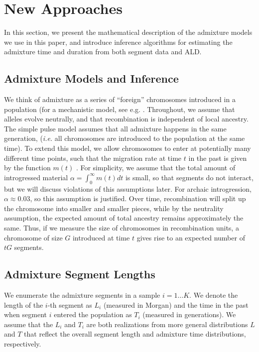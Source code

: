 \documentclass[11pt]{article}
\begin{document}
\section{New Approaches}\label{new approaches}

In this section, we present the mathematical description of the admixture models we use in this paper, and introduce inference algorithms for estimating the admixture time and duration from both segment data and ALD. 


\subsection{Admixture Models and Inference}\label{admixture models}
	
We think of admixture as a series of ``foreign'' chromosomes introduced in a population (for a mechanistic model, see e.g. \cite{pool_inference_2009}. Throughout, we assume that alleles evolve neutrally, and that recombination is independent of local ancestry. The simple pulse model assumes that all admixture happens in the same generation, (\textit{i.e.} all chromosomes are introduced to the population at the same time). To extend this model, we allow chromosomes to enter at potentially many different time points, such that the migration rate at time $t$ in the past is given by the function $m(t)$ \citep{pool_inference_2009, ni_length_2016}. For simplicity, we assume that the total amount of introgressed material $\alpha=\int_0^\infty m(t)dt$ is small, so that segments do not interact, but we will discuss violations of this assumptions later. For archaic introgression, $\alpha \approx 0.03$, so this assumption is justified. Over time, recombination will split up the chromosome into smaller and smaller pieces, while by the neutrality assumption, the expected amount of total ancestry remains approximately the same. Thus, if we measure the size of chromosomes in recombination units, a chromosome of size $G$ introduced at time $t$ gives rise to an expected number of $tG$ segments.


\subsection{Admixture Segment Lengths}
We enumerate the admixture segments in a sample $i=1\dots K$. We denote the length of the $i$-th segment as $L_i$ (measured in Morgan) and the time in the past when segment $i$ entered the population as $T_i$ (measured in generations). We assume that the $L_i$ and $T_i$ are both realizations from more general distributions $L$ and $T$ that reflect the overall segment length and admixture time distributions, respectively. 
\end{document}
